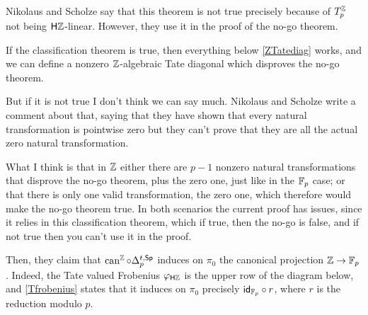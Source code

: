 \begin{remark}
{	Nikolaus and Scholze say that this theorem is not true precisely because of \(T_p^{\mathbb{Z}}\) not being \(\mathsf{H}\mathbb{Z}\)-linear. However, they use it in the proof of the no-go theorem.
	
	If the classification theorem is true, then everything below \cref{ZTatediag} works, and we can define a nonzero \(\mathbb{Z}\)-algebraic Tate diagonal which disproves the no-go theorem.
	
	But if it is not true I don't think we can say much. Nikolaus and Scholze write a comment about that, saying that they have shown that every natural transformation is pointwise zero but they can't prove that they are all the actual zero natural transformation.
	
	What I think is that in \(\mathbb{Z}\) either there are \(p-1\) nonzero natural transformations that disprove the no-go theorem, plus the zero one, just like in the \({\mathbb{F}_p}\) case; or that there is only one valid transformation, the zero one, which therefore would make the no-go theorem true. In both scenarios the current proof has issues, since it relies in this classification theorem, which if true, then the no-go is false, and if not true then you can't use it in the proof.}
	
	Then, they claim that \(\operatorname{can}^{\mathbb{Z}}\circ \Delta_p^{t,\mathsf{Sp}}\) induces on \(\pi_0\) the canonical projection \(\mathbb{Z}\to{\mathbb{F}_p}\).
	Indeed, the Tate valued Frobenius \(\varphi_{\mathsf{H} \mathbb{Z}}\) is the upper row of the diagram below, and \cref{Tfrobenius} states that it induces on \(\pi_0\) precisely \(\mathsf{id}_{{\mathbb{F}_p}}\circ r\), where \(r\) is the reduction modulo \(p\). %
	\begin{center}
	\end{center}
	

\end{remark}
